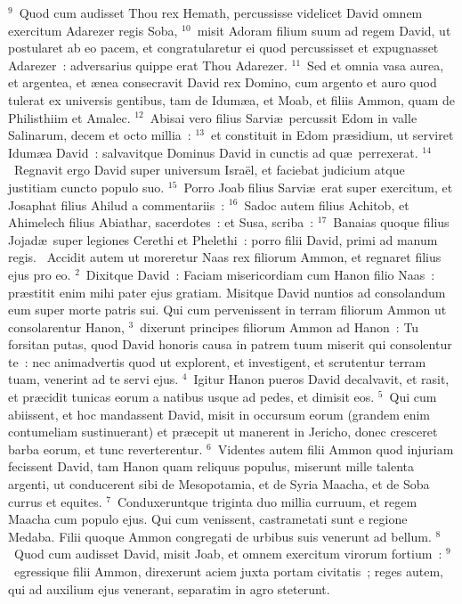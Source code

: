 ${}^{9}$~Quod cum audisset Thou rex Hemath, percussisse videlicet David omnem exercitum Adarezer regis Soba,
${}^{10}$~misit Adoram filium suum ad regem David, ut postularet ab eo pacem, et congratularetur ei quod percussisset et expugnasset Adarezer~: adversarius quippe erat Thou Adarezer.
${}^{11}$~Sed et omnia vasa aurea, et argentea, et \ae nea consecravit David rex Domino, cum argento et auro quod tulerat ex universis gentibus, tam de Idum\ae a, et Moab, et filiis Ammon, quam de Philisthiim et Amalec.
${}^{12}$~Abisai vero filius Sarvi\ae\ percussit Edom in valle Salinarum, decem et octo millia~:
${}^{13}$~et constituit in Edom pr\ae sidium, ut serviret Idum\ae a David~: salvavitque Dominus David in cunctis ad qu\ae\ perrexerat.
${}^{14}$~Regnavit ergo David super universum Isra\"el, et faciebat judicium atque justitiam cuncto populo suo.
${}^{15}$~Porro Joab filius Sarvi\ae\ erat super exercitum, et Josaphat filius Ahilud a commentariis~:
${}^{16}$~Sadoc autem filius Achitob, et Ahimelech filius Abiathar, sacerdotes~: et Susa, scriba~:
${}^{17}$~Banaias quoque filius Jojad\ae\ super legiones Cerethi et Phelethi~: porro filii David, primi ad manum regis.
~Accidit autem ut moreretur Naas rex filiorum Ammon, et regnaret filius ejus pro eo.
${}^{2}$~Dixitque David~: Faciam misericordiam cum Hanon filio Naas~: pr\ae stitit enim mihi pater ejus gratiam. Misitque David nuntios ad consolandum eum super morte patris sui. Qui cum pervenissent in terram filiorum Ammon ut consolarentur Hanon,
${}^{3}$~dixerunt principes filiorum Ammon ad Hanon~: Tu forsitan putas, quod David honoris causa in patrem tuum miserit qui consolentur te~: nec animadvertis quod ut explorent, et investigent, et scrutentur terram tuam, venerint ad te servi ejus.
${}^{4}$~Igitur Hanon pueros David decalvavit, et rasit, et pr\ae cidit tunicas eorum a natibus usque ad pedes, et dimisit eos.
${}^{5}$~Qui cum abiissent, et hoc mandassent David, misit in occursum eorum (grandem enim contumeliam sustinuerant) et pr\ae cepit ut manerent in Jericho, donec cresceret barba eorum, et tunc reverterentur.
${}^{6}$~Videntes autem filii Ammon quod injuriam fecissent David, tam Hanon quam reliquus populus, miserunt mille talenta argenti, ut conducerent sibi de Mesopotamia, et de Syria Maacha, et de Soba currus et equites.
${}^{7}$~Conduxeruntque triginta duo millia curruum, et regem Maacha cum populo ejus. Qui cum venissent, castrametati sunt e regione Medaba. Filii quoque Ammon congregati de urbibus suis venerunt ad bellum.
${}^{8}$~Quod cum audisset David, misit Joab, et omnem exercitum virorum fortium~:
${}^{9}$~egressique filii Ammon, direxerunt aciem juxta portam civitatis~; reges autem, qui ad auxilium ejus venerant, separatim in agro steterunt.


